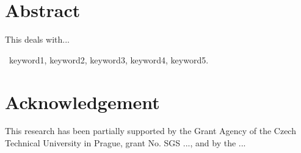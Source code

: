 \section*{Abstract}

This \thesis{} deals with...

\bigskip


~keyword1, keyword2, keyword3, keyword4, keyword5.

\vfill

\section*{Acknowledgement}
This research has been partially supported 
by the Grant Agency of the Czech Technical University in Prague, grant No. SGS ..., and
by the ...